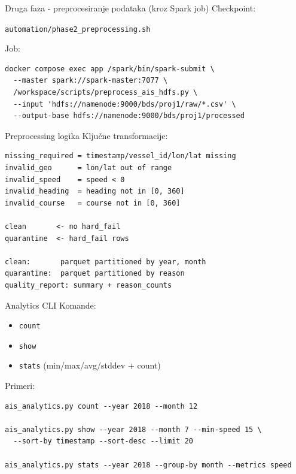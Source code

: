 \documentclass[aspectratio=169,11pt]{beamer}
\newcommand{\code}[1]{\texttt{\small #1}}
\begin{document}
\begin{frame}[fragile]{Druga faza - preprocesiranje podataka (kroz Spark job)}
  Checkpoint:
\begin{center}
	\code{automation/phase2\_preprocessing.sh}
\end{center}
  
Job:
  \begin{verbatim}
docker compose exec app /spark/bin/spark-submit \
  --master spark://spark-master:7077 \
  /workspace/scripts/preprocess_ais_hdfs.py \
  --input 'hdfs://namenode:9000/bds/proj1/raw/*.csv' \
  --output-base hdfs://namenode:9000/bds/proj1/processed
  \end{verbatim}
\end{frame}

\begin{frame}[fragile]{Preprocessing logika}
  Ključne transformacije:
  \begin{verbatim}
missing_required = timestamp/vessel_id/lon/lat missing
invalid_geo      = lon/lat out of range
invalid_speed    = speed < 0
invalid_heading  = heading not in [0, 360]
invalid_course   = course not in [0, 360]

clean       <- no hard_fail
quarantine  <- hard_fail rows

clean:       parquet partitioned by year, month
quarantine:  parquet partitioned by reason
quality_report: summary + reason_counts
  \end{verbatim}
\end{frame}

\begin{frame}[fragile]{Analytics CLI}
  Komande:
  \begin{itemize}
    \item \code{count}
    \item \code{show}
    \item \code{stats} (min/max/avg/stddev + count)
  \end{itemize}

  Primeri:
  \begin{verbatim}
ais_analytics.py count --year 2018 --month 12

ais_analytics.py show --year 2018 --month 7 --min-speed 15 \
  --sort-by timestamp --sort-desc --limit 20

ais_analytics.py stats --year 2018 --group-by month --metrics speed
  \end{verbatim}
\end{frame}
\end{document}
